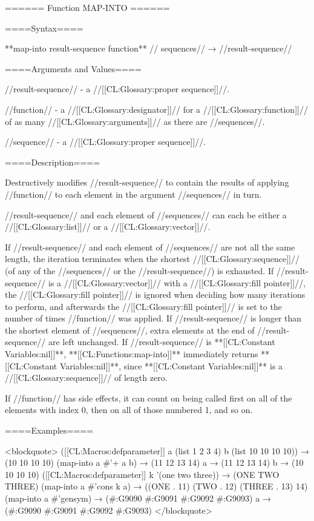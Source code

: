 ====== Function MAP-INTO ======

====Syntax====

**map-into {result-sequence function** //\rest} sequences// → //result-sequence//

====Arguments and Values====

//result-sequence// - a //[[CL:Glossary:proper sequence]]//.

//function// - a //[[CL:Glossary:designator]]// for a //[[CL:Glossary:function]]// of as many //[[CL:Glossary:arguments]]// as there are //sequences//.

//sequence// - a //[[CL:Glossary:proper sequence]]//.

====Description====

Destructively modifies //result-sequence// to contain the results of applying //function// to each element in the argument //sequences// in turn.

//result-sequence// and each element of //sequences// can each be either a //[[CL:Glossary:list]]// or a //[[CL:Glossary:vector]]//.

If //result-sequence// and each element of //sequences// are not all the same length, the iteration terminates when the shortest //[[CL:Glossary:sequence]]// (of any of the //sequences// or the //result-sequence//) is exhausted. If //result-sequence// is a //[[CL:Glossary:vector]]// with a //[[CL:Glossary:fill pointer]]//, the //[[CL:Glossary:fill pointer]]// is ignored when deciding how many iterations to perform, and afterwards the //[[CL:Glossary:fill pointer]]// is set to the number of times //function// was applied. If //result-sequence// is longer than the shortest element of //sequences//, extra elements at the end of //result-sequence// are left unchanged. If //result-sequence// is **[[CL:Constant Variables:nil]]**, **[[CL:Functions:map-into]]** immediately returns **[[CL:Constant Variables:nil]]**, since **[[CL:Constant Variables:nil]]** is a //[[CL:Glossary:sequence]]// of length zero.

If //function// has side effects, it can count on being called first on all of the elements with index 0, then on all of those numbered 1, and so on.

====Examples====

<blockquote> ([[CL:Macros:defparameter]] a (list 1 2 3 4) b (list 10 10 10 10)) → (10 10 10 10) (map-into a #'+ a b) → (11 12 13 14) a → (11 12 13 14) b → (10 10 10 10) ([[CL:Macros:defparameter]] k '(one two three)) → (ONE TWO THREE) (map-into a #'cons k a) → ((ONE . 11) (TWO . 12) (THREE . 13) 14) (map-into a #'gensym) → (#:G9090 #:G9091 #:G9092 #:G9093) a → (#:G9090 #:G9091 #:G9092 #:G9093) </blockquote>

